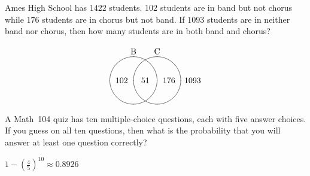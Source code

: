 \documentclass[answers,addpoints,12pt]{exam}
\begin{document}
\begin{questions}
\question[12] Ames High School has $1422$ students.
$102$ students are in band but not chorus while
$176$ students are in chorus but not band.
If $1093$ students are in neither band nor chorus,
then how many students are in both band and chorus?
\begin{solution}
\[\begin{xy}<.5cm,0cm>:
(-1,2)*+!D{\text{B}};
(1,2)*+!D{\text{C}};
(-1,0)*\cir<1cm>{};
(1,0)*\cir<1cm>{};
(0,0)*{51};
(-2,0)*{102};
(2,0)*{176};
(4,0)*{1093};
\end{xy}\]
\end{solution}

\question[12] A Math~104 quiz has ten multiple-choice
questions, each with five answer choices. If you guess on all
ten questions, then what is the probability that you will answer at
least one question correctly?
\begin{solution}
$1-\left(\frac{4}{5}\right)^{10}\approx 0.8926$
\end{solution}

\end{questions}

\vfill\ifprintanswers\else
\begin{center}\gradetable[h][questions]\end{center}\fi
\end{document}
